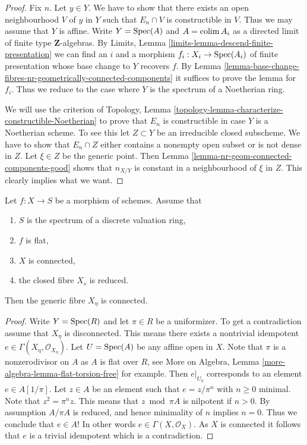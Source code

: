 \begin{proof}
Fix $n$. Let $y \in Y$. We have to show that there exists an open neighbourhood
$V$ of $y$ in $Y$ such that $E_n \cap V$ is constructible in $V$. Thus we may
assume that $Y$ is affine. Write $Y = \mathop{\rm Spec}(A)$ and
$A = \mathop{\rm colim}\nolimits A_i$ as a directed limit of finite type
$\mathbf{Z}$-algebras. By
Limits, Lemma \ref{limits-lemma-descend-finite-presentation}
we can find an $i$ and a morphism $f_i : X_i \to \mathop{\rm Spec}(A_i)$ of
finite presentation whose base change to $Y$ recovers $f$. By
Lemma \ref{lemma-base-change-fibres-nr-geometrically-connected-components}
it suffices to prove the lemma for $f_i$. Thus we reduce to
the case where $Y$ is the spectrum of a Noetherian ring.

\medskip\noindent
We will use the criterion of
Topology, Lemma \ref{topology-lemma-characterize-constructible-Noetherian}
to prove that $E_n$ is constructible in case $Y$ is a Noetherian scheme.
To see this let $Z \subset Y$ be an irreducible closed subscheme.
We have to show that $E_n \cap Z$ either contains a nonempty open subset
or is not dense in $Z$. Let $\xi \in Z$ be the generic point. Then
Lemma \ref{lemma-nr-geom-connected-components-good}
shows that $n_{X/Y}$ is constant in a neighbourhood of $\xi$ in $Z$.
This clearly implies what we want.
\end{proof}

\begin{lemma}
\label{lemma-connected-flat-over-dvr}
Let $f : X \to S$ be a morphism of schemes.
Assume that
\begin{enumerate}
\item $S$ is the spectrum of a discrete valuation ring,
\item $f$ is flat,
\item $X$ is connected,
\item the closed fibre $X_s$ is reduced.
\end{enumerate}
Then the generic fibre $X_\eta$ is connected.
\end{lemma}

\begin{proof}
Write $Y = \mathop{\rm Spec}(R)$ and let $\pi \in R$ be a uniformizer.
To get a contradiction assume that $X_\eta$ is disconnected.
This means there exists a nontrivial idempotent
$e \in \Gamma(X_\eta, \mathcal{O}_{X_\eta})$.
Let $U = \mathop{\rm Spec}(A)$ be any affine open in $X$.
Note that $\pi$ is a nonzerodivisor on $A$ as $A$ is flat over $R$, see
More on Algebra, Lemma \ref{more-algebra-lemma-flat-torsion-free}
for example. Then $e|_{U_\eta}$ corresponds to an element $e \in A[1/\pi]$.
Let $z \in A$ be an element such that $e = z/\pi^n$ with $n \geq 0$ minimal.
Note that $z^2 = \pi^nz$. This means that $z \bmod \pi A$ is nilpotent
if $n > 0$. By assumption $A/\pi A$ is reduced, and hence minimality of
$n$ implies $n = 0$. Thus we conclude that $e \in A$! In other words
$e \in \Gamma(X, \mathcal{O}_X)$. As $X$ is connected it follows
that $e$ is a trivial idempotent which is a contradiction.
\end{proof}







